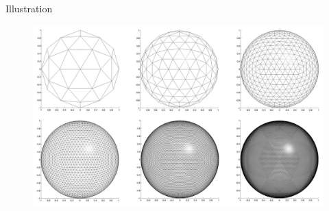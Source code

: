 \documentclass{beamer}
\begin{document}
\begin{frame}{Illustration}
	\begin{figure}
		\includegraphics[width=\textwidth]{img/sphere}
	\end{figure}
\end{frame}
\end{document}
